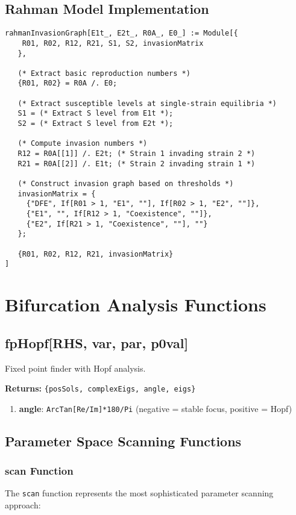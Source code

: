 \documentclass{article}
\begin{document}
\subsection{Rahman Model Implementation}

\begin{lstlisting}
rahmanInvasionGraph[E1t_, E2t_, R0A_, E0_] := Module[{
    R01, R02, R12, R21, S1, S2, invasionMatrix
   },

   (* Extract basic reproduction numbers *)
   {R01, R02} = R0A /. E0;

   (* Extract susceptible levels at single-strain equilibria *)
   S1 = (* Extract S level from E1t *);
   S2 = (* Extract S level from E2t *);

   (* Compute invasion numbers *)
   R12 = R0A[[1]] /. E2t; (* Strain 1 invading strain 2 *)
   R21 = R0A[[2]] /. E1t; (* Strain 2 invading strain 1 *)

   (* Construct invasion graph based on thresholds *)
   invasionMatrix = {
     {"DFE", If[R01 > 1, "E1", ""], If[R02 > 1, "E2", ""]},
     {"E1", "", If[R12 > 1, "Coexistence", ""]},
     {"E2", If[R21 > 1, "Coexistence", ""], ""}
   };

   {R01, R02, R12, R21, invasionMatrix}
]
\end{lstlisting}

\section{Bifurcation Analysis Functions}

\subsection{fpHopf[RHS, var, par, p0val]}
Fixed point finder with Hopf analysis.

\textbf{Returns:} \texttt{\{posSols, complexEigs, angle, eigs\}}
\begin{enumerate}
\item \textbf{angle}: \texttt{ArcTan[Re/Im]*180/Pi} (negative = stable focus, positive = Hopf)
\end{enumerate}

\subsection{Parameter Space Scanning Functions}

\subsubsection{scan Function}
The \texttt{scan} function represents the most sophisticated parameter scanning approach:
\end{document}
